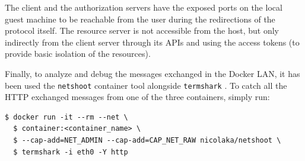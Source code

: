 The client and the authorization servers have the exposed ports on the local guest machine to be reachable from the user during the redirections of the protocol itself. The resource server is not accessible from the host, but only indirectly from the client server through its APIs and using the access tokens (to provide basic isolation of the resources).
\label{docker}

Finally, to analyze and debug the messages exchanged in the Docker LAN, it has been used the \texttt{netshoot} \cite{netsh} container tool alongside \texttt{termshark} \cite{terms}. To catch all the HTTP exchanged messages from one of the three containers, simply run:
\begin{lstlisting}[basicstyle=\ttfamily]
  $ docker run -it --rm --net \ 
  $ container:<container_name> \ 
  $ --cap-add=NET_ADMIN --cap-add=CAP_NET_RAW nicolaka/netshoot \
  $ termshark -i eth0 -Y http
\end{lstlisting}


